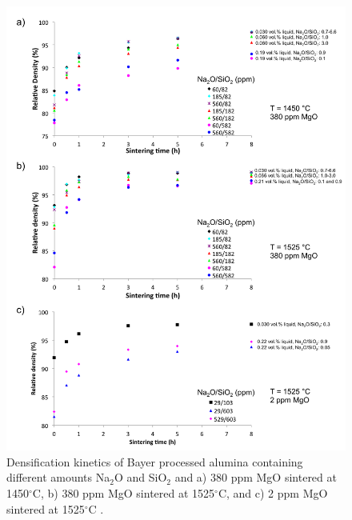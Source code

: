 \newpage
\begin{figure}[H]
	\centering
	\includegraphics[width=\textwidth]{Chapter-3/Figures/Figure3.png}
	\caption{Densification kinetics of Bayer processed alumina containing different amounts Na$_{2}$O and SiO$_{2}$ and a) 380 ppm MgO sintered at 1450$^{\circ}$C, b) 380 ppm MgO sintered at 1525$^{\circ}$C, and c) 2 ppm MgO sintered at 1525$^{\circ}$C \cite{Bae1997}.}
	\label{Ch3-figure:Figure3}
\end{figure}

